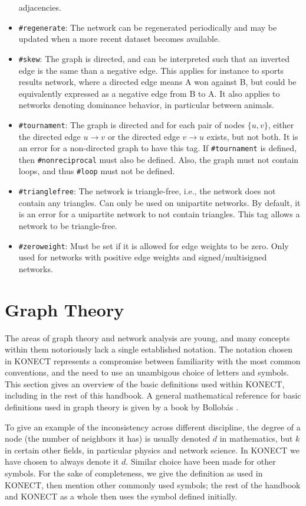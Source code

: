 \documentclass{article}
\begin{document}
\begin{itemize}
  adjacencies. 
\item \texttt{\#regenerate}: The network can be regenerated
  periodically and may be updated when a more recent dataset
  becomes available.
\item \texttt{\#skew}:  The graph is directed,
  and can be interpreted such that an inverted edge is the same than a
  negative edge.  This applies for instance to sports results network,
  where a directed edge means A won against B, but could be equivalently
  expressed as a negative edge from B to A.  It also applies to networks
  denoting dominance behavior, in particular between animals. 
\item \texttt{\#tournament}:  The graph is directed and for each
  pair of nodes $\{u,v\}$, either the directed edge $u \rightarrow v$ or
  the directed edge $v \rightarrow u$ exists, but not both.  It
  is an error for a non-directed graph to have this tag.  If
  \texttt{\#tournament} is defined, then
  \texttt{\#nonreciprocal} must also be defined.  Also, the graph must
  not contain loops, and thus
  \texttt{\#loop} must not be defined. 
\item \texttt{\#trianglefree}:  The network is triangle-free, i.e., the
  network does not contain any triangles.  Can only be used on
  unipartite networks.  By default, it is an error for a unipartite
  network to not contain triangles.  This tag allows a network to be
  triangle-free. 
\item \texttt{\#zeroweight}:  Must be set if it is allowed for edge
  weights to be zero. Only used for networks with positive edge
  weights and signed/multisigned networks. 
\end{itemize}

\section{Graph Theory}
\label{sec:definitions}
The areas of graph theory and network analysis are young, and
many concepts within them notoriously lack a single established notation.  The
notation chosen in KONECT represents a compromise between familiarity
with the most common conventions, and the need to use an unambigous
choice of letters and symbols.  This section gives an overview of the
basic definitions used within KONECT, including in the rest of this handbook. 
A general mathematical reference for basic definitions used in graph
theory is given by a book by Bollobás \citeyearpar{b116}.  

To give an example of the inconsistency across different discipline, the
degree of a node (the number of neighbors it has) is usually denoted $d$
in mathematics, but $k$ in certain other fields, in particular physics
and network science.  In KONECT we have chosen to always denote it $d$.
Similar choice have been made for other symbols.  For the sake of
completeness, we give the definition as used in KONECT, then mention
other commonly used symbols; the rest of the handbook and KONECT as a
whole then uses the symbol defined initially. 
\end{document}
